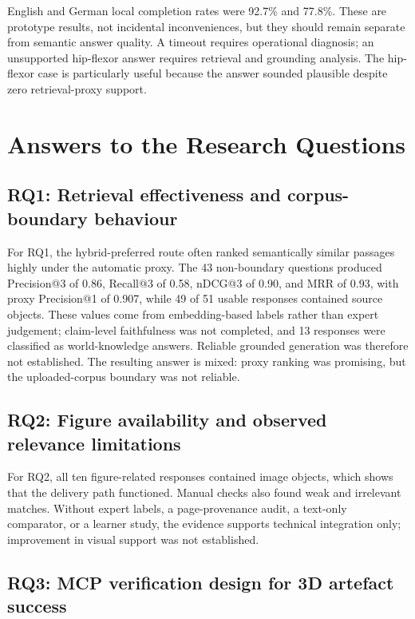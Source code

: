 English and German local completion rates were 92.7\% and 77.8\%. These are prototype results, not incidental inconveniences, but they should remain separate from semantic answer quality. A timeout requires operational diagnosis; an unsupported hip-flexor answer requires retrieval and grounding analysis. The hip-flexor case is particularly useful because the answer sounded plausible despite zero retrieval-proxy support.

\section{Answers to the Research Questions}
\label{sec:rq-answers}

\subsection{RQ1: Retrieval effectiveness and corpus-boundary behaviour}
\label{subsec:rq1-answer}

For RQ1, the hybrid-preferred route often ranked semantically similar passages highly under the automatic proxy. The 43 non-boundary questions produced Precision@3 of 0.86, Recall@3 of 0.58, nDCG@3 of 0.90, and MRR of 0.93, with proxy Precision@1 of 0.907, while 49 of 51 usable responses contained source objects. These values come from embedding-based labels rather than expert judgement; claim-level faithfulness was not completed, and 13 responses were classified as world-knowledge answers. Reliable grounded generation was therefore not established. The resulting answer is mixed: proxy ranking was promising, but the uploaded-corpus boundary was not reliable.

\subsection{RQ2: Figure availability and observed relevance limitations}
\label{subsec:rq2-answer}

For RQ2, all ten figure-related responses contained image objects, which shows that the delivery path functioned. Manual checks also found weak and irrelevant matches. Without expert labels, a page-provenance audit, a text-only comparator, or a learner study, the evidence supports technical integration only; improvement in visual support was not established.

\subsection{RQ3: MCP verification design for 3D artefact success}
\label{subsec:rq3-answer}

